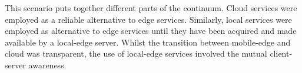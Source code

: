 This scenario puts together different parts of the continuum. Cloud services were employed as a reliable alternative to edge services. Similarly, local services were employed as alternative to edge services until they have been acquired and made available by a local-edge server. Whilst the transition between mobile-edge and cloud was transparent, the use of local-edge services involved the mutual client-server awareness.



